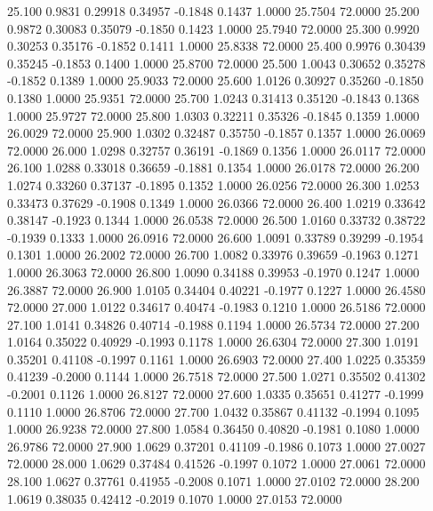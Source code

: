   25.100   0.9831   0.29918   0.34957  -0.1848   0.1437   1.0000  25.7504  72.0000
  25.200   0.9872   0.30083   0.35079  -0.1850   0.1423   1.0000  25.7940  72.0000
  25.300   0.9920   0.30253   0.35176  -0.1852   0.1411   1.0000  25.8338  72.0000
  25.400   0.9976   0.30439   0.35245  -0.1853   0.1400   1.0000  25.8700  72.0000
  25.500   1.0043   0.30652   0.35278  -0.1852   0.1389   1.0000  25.9033  72.0000
  25.600   1.0126   0.30927   0.35260  -0.1850   0.1380   1.0000  25.9351  72.0000
  25.700   1.0243   0.31413   0.35120  -0.1843   0.1368   1.0000  25.9727  72.0000
  25.800   1.0303   0.32211   0.35326  -0.1845   0.1359   1.0000  26.0029  72.0000
  25.900   1.0302   0.32487   0.35750  -0.1857   0.1357   1.0000  26.0069  72.0000
  26.000   1.0298   0.32757   0.36191  -0.1869   0.1356   1.0000  26.0117  72.0000
  26.100   1.0288   0.33018   0.36659  -0.1881   0.1354   1.0000  26.0178  72.0000
  26.200   1.0274   0.33260   0.37137  -0.1895   0.1352   1.0000  26.0256  72.0000
  26.300   1.0253   0.33473   0.37629  -0.1908   0.1349   1.0000  26.0366  72.0000
  26.400   1.0219   0.33642   0.38147  -0.1923   0.1344   1.0000  26.0538  72.0000
  26.500   1.0160   0.33732   0.38722  -0.1939   0.1333   1.0000  26.0916  72.0000
  26.600   1.0091   0.33789   0.39299  -0.1954   0.1301   1.0000  26.2002  72.0000
  26.700   1.0082   0.33976   0.39659  -0.1963   0.1271   1.0000  26.3063  72.0000
  26.800   1.0090   0.34188   0.39953  -0.1970   0.1247   1.0000  26.3887  72.0000
  26.900   1.0105   0.34404   0.40221  -0.1977   0.1227   1.0000  26.4580  72.0000
  27.000   1.0122   0.34617   0.40474  -0.1983   0.1210   1.0000  26.5186  72.0000
  27.100   1.0141   0.34826   0.40714  -0.1988   0.1194   1.0000  26.5734  72.0000
  27.200   1.0164   0.35022   0.40929  -0.1993   0.1178   1.0000  26.6304  72.0000
  27.300   1.0191   0.35201   0.41108  -0.1997   0.1161   1.0000  26.6903  72.0000
  27.400   1.0225   0.35359   0.41239  -0.2000   0.1144   1.0000  26.7518  72.0000
  27.500   1.0271   0.35502   0.41302  -0.2001   0.1126   1.0000  26.8127  72.0000
  27.600   1.0335   0.35651   0.41277  -0.1999   0.1110   1.0000  26.8706  72.0000
  27.700   1.0432   0.35867   0.41132  -0.1994   0.1095   1.0000  26.9238  72.0000
  27.800   1.0584   0.36450   0.40820  -0.1981   0.1080   1.0000  26.9786  72.0000
  27.900   1.0629   0.37201   0.41109  -0.1986   0.1073   1.0000  27.0027  72.0000
  28.000   1.0629   0.37484   0.41526  -0.1997   0.1072   1.0000  27.0061  72.0000
  28.100   1.0627   0.37761   0.41955  -0.2008   0.1071   1.0000  27.0102  72.0000
  28.200   1.0619   0.38035   0.42412  -0.2019   0.1070   1.0000  27.0153  72.0000
